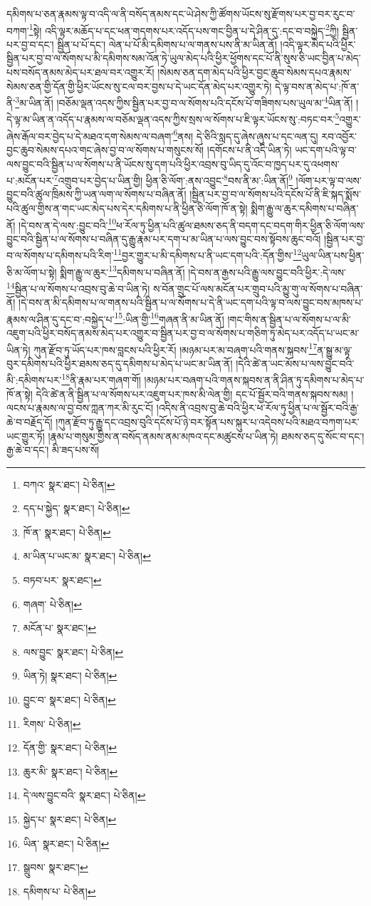 དམིགས་པ་ཅན་རྣམས་ལྟ་བ་འདི་ལ་ནི་བསོད་ནམས་དང་ཡེ་ཤེས་ཀྱི་ཚོགས་ཡོངས་སུ་རྫོགས་པར་བྱ་བར་རུང་བ་བཀག་\footnote{བཀའ་  སྣར་ཐང་།  པེ་ཅིན། }སྟེ། འདི་ལྟར་མཆོད་པ་དང་ཕན་གདགས་པར་འདོད་པས་གང་བྱིན་པ་དེ་ཤིན་དུ་:དང་བ་བསྐྱེད་\footnote{དད་པ་སྐྱེད་  སྣར་ཐང་།  པེ་ཅིན། }ཀྱི། སྦྱིན་པར་བྱ་བ་དང་། སྦྱིན་པ་པོ་དང་། ལེན་པ་པོ་མི་དམིགས་པ་ལ་གནས་པས་ནི་མ་ཡིན་ནོ། །འདི་ལྟར་མེད་པའི་ཕྱིར་སྦྱིན་པར་བྱ་བ་ལ་སོགས་པ་མི་དམིགས་སམ་འོན་ཏེ་ཡུལ་མེད་པའི་ཕྱིར་ཕྱོགས་དང་པོ་ནི་སུས་ཅི་ཡང་བྱིན་པ་མེད་པས་བསོད་ནམས་མེད་པར་ཐལ་བར་འགྱུར་རོ། །སེམས་ཅན་དག་མེད་པའི་ཕྱིར་བྱང་ཆུབ་སེམས་དཔའ་རྣམས་སེམས་ཅན་གྱི་དོན་གྱི་ཕྱིར་ཡོངས་སུ་ངལ་བར་བྱས་པ་དེ་ཡང་དོན་མེད་པར་འགྱུར་ཏེ། དེ་ལྟ་བས་ན་མེད་པ་:ཁོ་ན་ནི་\footnote{ཁོ་ན་  སྣར་ཐང་།  པེ་ཅིན། }མ་ཡིན་ནོ། །བཅོམ་ལྡན་འདས་ཀྱིས་སྦྱིན་པར་བྱ་བ་ལ་སོགས་པའི་དངོས་པོ་གཟིགས་པས་ཡུལ་མ་\footnote{མ་ཡིན་པ་ཡང་མ་  སྣར་ཐང་།  པེ་ཅིན། }ཡིན་ནོ། །དེ་ལྟ་མ་ཡིན་ན་འདོད་པ་རྣམས་ལ་བཅོམ་ལྡན་འདས་ཀྱིས་སྲས་ལ་སོགས་པ་ཇི་ལྟར་ཡོངས་སུ་:བཏང་བར་\footnote{བཏབ་པར་  སྣར་ཐང་། }འགྱུར་ཞེས་རྒོལ་བར་བྱེད་པ་དེ་མཐའ་དག་སེམས་ལ་བཞག་\footnote{གཞག་  པེ་ཅིན། }ནས། དེ་ཅིའི་སླད་དུ་ཞེས་ཞུས་པ་དང་ལན་དུ། རབ་འབྱོར་བྱང་ཆུབ་སེམས་དཔའ་གང་ཞེས་བྱ་བ་ལ་སོགས་པ་གསུངས་སོ། །དགོངས་པ་ནི་འདི་ཡིན་ཏེ། ཡང་དག་པའི་ལྟ་བ་ལས་བྱུང་བའི་སྦྱིན་པ་ལ་སོགས་པ་ནི་ཡོངས་སུ་དག་པའི་ཕྱིར་འབྲས་བུ་ཡིད་དུ་འོང་བ་ཁྱད་པར་དུ་འཕགས་པ་:མངོན་པར་\footnote{མངོན་པ་  སྣར་ཐང་། }འགྲུབ་པར་བྱེད་པ་ཡིན་གྱི། ཕྱིན་ཅི་ལོག་:ནས་འབྱུང་\footnote{ལས་བྱུང་  སྣར་ཐང་།  པེ་ཅིན། }བས་ནི་མ་:ཡིན་ནོ།\footnote{ཡིན་ཏེ།  སྣར་ཐང་།  པེ་ཅིན། } །ལོག་པར་ལྟ་བ་ལས་བྱུང་བའི་ཚུལ་ཁྲིམས་ཀྱི་ཡན་ལག་ལ་སོགས་པ་བཞིན་ནོ། །སྦྱིན་པར་བྱ་བ་ལ་སོགས་པའི་དངོས་པོ་ནི་ཇི་སྐད་སྨོས་པའི་ཚུལ་གྱིས་ན་གང་ཡང་མེད་པས་དེར་དམིགས་པ་ནི་ཕྱིན་ཅི་ལོག་ཁོ་ན་སྟེ། སྨིག་རྒྱུ་ལ་ཆུར་དམིགས་པ་བཞིན་ནོ། །དེ་བས་ན་དེ་ལས་:བྱུང་བའི་\footnote{བྱུང་བ་  སྣར་ཐང་།  པེ་ཅིན། }ཕ་རོལ་ཏུ་ཕྱིན་པའི་ཚུལ་ཐམས་ཅད་ནི་བདག་དང་བདག་གིར་ཕྱིན་ཅི་ལོག་ལས་བྱུང་བའི་སྦྱིན་པ་ལ་སོགས་པ་བཞིན་དུ་རྒྱུ་རྣམ་པར་དག་པ་མ་ཡིན་པ་ལས་བྱུང་བས་སྟོབས་ཆུང་བའོ། །སྦྱིན་པར་བྱ་བ་ལ་སོགས་པ་དམིགས་པའི་རིག་\footnote{རིགས་  པེ་ཅིན། }བྱར་གྱུར་པ་མི་དམིགས་པ་ནི་ཡང་དག་པའི་:དོན་གྱིས་\footnote{དོན་གྱི་  སྣར་ཐང་།  པེ་ཅིན། }ཡུལ་ཡིན་པས་ཕྱིན་ཅི་མ་ལོག་པ་སྟེ། སྨིག་རྒྱུ་ལ་ཆུར་\footnote{ཆུར་མི་  སྣར་ཐང་།  པེ་ཅིན། }དམིགས་པ་བཞིན་ནོ། །དེ་བས་ན་རྒྱས་པའི་རྒྱུ་ལས་བྱུང་བའི་ཕྱིར་:དེ་ལས་\footnote{དེ་ལས་བྱུང་བའི་  སྣར་ཐང་།  པེ་ཅིན། }སྦྱིན་པ་ལ་སོགས་པ་འབྲས་བུ་ཆེ་བ་ཡིན་ཏེ། ས་བོན་གྲུང་པོ་ལས་མངོན་པར་གྲུབ་པའི་མྱུ་གུ་ལ་སོགས་པ་བཞིན་ནོ། །དེ་བས་ན་མི་དམིགས་པ་ལ་གནས་པའི་སྦྱིན་པ་ལ་སོགས་པ་དེ་ནི་ཡང་དག་པའི་ལྟ་བ་ལས་བྱུང་བས་མཁས་པ་རྣམས་ལ་ཤིན་དུ་དང་བ་:བསྐྱེད་པ་\footnote{སྐྱེད་པ་  སྣར་ཐང་།  པེ་ཅིན། }:ཡིན་གྱི་\footnote{ཡིན་  སྣར་ཐང་།  པེ་ཅིན། }གཞན་ནི་མ་ཡིན་ནོ། །གང་གིས་ན་སྦྱིན་པ་ལ་སོགས་པ་ལ་མི་འཇུག་པའི་ཕྱིར་བསོད་ནམས་མེད་པར་འགྱུར་བ་སྦྱིན་པར་བྱ་བ་ལ་སོགས་པ་གཅིག་ཏུ་མེད་པར་འདོད་པ་ཡང་མ་ཡིན་ཏེ། ཀུན་རྫོབ་ཏུ་ཡོད་པར་ཁས་བླངས་པའི་ཕྱིར་རོ། །མཉམ་པར་མ་བཞག་པའི་གནས་སྐབས་\footnote{སྒྲུབས་  སྣར་ཐང་། }ན་སྒྱུ་མ་ལྟ་བུར་དམིགས་པའི་ཕྱིར་ཐམས་ཅད་དུ་དམིགས་པ་མེད་པ་ཡང་མ་ཡིན་ནོ། །དེའི་ཚེ་ན་ཡང་མོས་པ་ལས་བྱུང་བའི་མི་:དམིགས་པར་\footnote{དམིགས་པ་  པེ་ཅིན། }ནི་རྣམ་པར་གཞག་གོ། །མཉམ་པར་བཞག་པའི་གནས་སྐབས་ན་ནི་ཤིན་ཏུ་དམིགས་པ་མེད་པ་ཁོ་ན་སྟེ། དེའི་ཚེ་ན་ནི་སྦྱིན་པ་ལ་སོགས་པར་འཇུག་པར་ཁས་མི་ལེན་གྱི། དང་པོ་སྦྱོར་བའི་གནས་སྐབས་སམ། །ལངས་པ་རྣམས་ལ་བྱ་བས་ཀླན་ཀར་མི་རུང་ངོ། །འདིས་ནི་འབྲས་བུ་ཆེ་བའི་ཕྱིར་ཕ་རོལ་ཏུ་ཕྱིན་པ་ལ་སྦྱོར་བའི་རྒྱ་ཆེ་བ་བརྗོད་དོ། །ཀུན་རྫོབ་ཏུ་རྒྱུ་དང་འབྲས་བུའི་དངོས་པོ་ཉེ་བར་སྟོན་པས་སྐུར་པ་འདེབས་པའི་མཐའ་བཀག་པར་ཡང་གྱུར་ཏོ། །རྣམ་པ་གསུམ་གྱིས་ན་བསོད་ནམས་ནམ་མཁའ་དང་མཚུངས་པ་ཡིན་ཏེ། ཐམས་ཅད་དུ་སོང་བ་དང་། རྒྱ་ཆེ་བ་དང་། མི་ཟད་པས་སོ། 